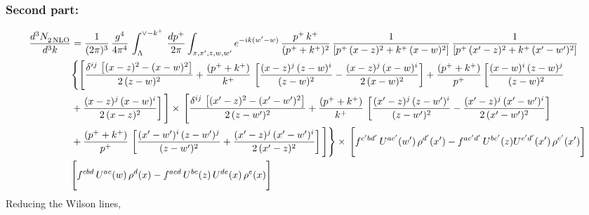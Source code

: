 \documentclass[9pt]{article}
\numberwithin{equation}{section}
\begin{document}
\subsubsection{Second part:\,}
\begin{align}
    \frac{d^{3}N_{2\,\rm NLO}^{\rm}}{d^{3}k}  & = \frac{1}{(2\pi)^{3}}\, \frac{g^{4}}{4\pi^{4}}\,\int_{\Lambda}^{\vee-k^{+}}\, \frac{dp^{+}}{2\pi}\int_{x,x',z,w,w^{\prime}} e^{-ik(w^{\prime}-w)}\,\frac{p^{+}\,k^{+}}{(p^{+}+k^{+})^{2}}\, \frac{1}{\left[p^{+}\,(x-z)^{2}+k^{+}\,(x-w)^{2}\right]}\,\frac{1}{\left[p^{+}\,(x'-z)^{2}+k^{+}\,(x'-w')^{2}\right]}\notag \\ & \Bigg\{\Bigg[\frac{\delta^{ij}\, \left[(x-z)^{2}-(x-w)^{2}\right]}{2\,(z-w)^{2}} + \frac{(p^{+}+k^{+})}{k^{+}}\, \left[\frac{(x-z)^{j}\,(z-w)^{i}}{(z-w)^{2}}-\frac{(x-z)^{j}\,(x-w)^{i}}{2\,(x-w)^{2}}\right]+\frac{(p^{+}+k^{+})}{p^{+}}\,\bigg[\frac{(x-w)^{i}\,(z-w)^{j}}{(z-w)^{2}}\notag \\ & +\frac{(x-z)^{j}\,(x-w)^{i}}{2\,(x-z)^{2}}\bigg]\,\Bigg]\times\, \Bigg[\frac{\delta^{ij}\, \left[(x'-z)^{2}-(x'-w')^{2}\right]}{2\,(z-w')^{2}}+ \frac{(p^{+}+k^{+})}{k^{+}}\, \left[\frac{(x'-z)^{j}\,(z-w')^{i}}{(z-w')^{2}}-\frac{(x'-z)^{j}\,(x'-w')^{i}}{2\,(x'-w')^{2}}\right]\notag \\ & +\frac{(p^{+}+k^{+})}{p^{+}}\,\left[\frac{(x'-w')^{i}\,(z-w')^{j}}{(z-w')^{2}} +\frac{(x'-z)^{j}\,(x'-w')^{i}}{2\,(x'-z)^{2}}\right] \Bigg] \Bigg\} \times\, \Bigg[f^{c'bd'}\, U^{ac'}(w')\,\rho^{d'}(x')-f^{ac'd'}\, U^{bc'}(z)U^{e'd'}(x')\, \rho^{e'}(x')\Bigg]\notag \\ & \Bigg[f^{cbd}\, U^{ac}(w)\,\rho^{d}(x) - f^{acd}\, U^{bc}(z)\,U^{de}(x)\, \rho^{e}(x)\Bigg]
\end{align}
Reducing the Wilson lines, 
\end{document}
